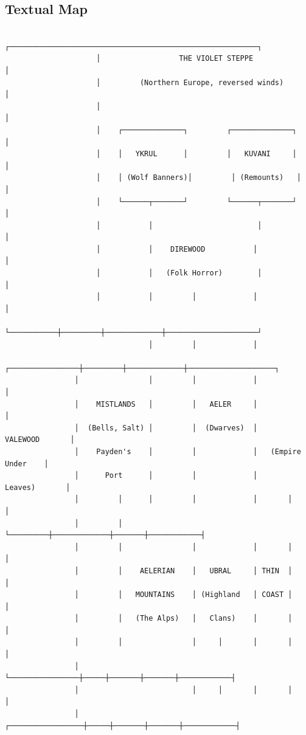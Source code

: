 \documentclass[11pt,letterpaper,twoside]{book}
\begin{document}
\subsection{Textual Map}

\begin{verbatim}
                     ┌─────────────────────────────────────────────────────────┐
                     │                  THE VIOLET STEPPE                     │
                     │         (Northern Europe, reversed winds)              │
                     │                                                         │
                     │    ┌──────────────┐         ┌──────────────┐           │
                     │    │   YKRUL      │         │   KUVANI     │           │
                     │    │ (Wolf Banners)│         │ (Remounts)   │           │
                     │    └──────┬───────┘         └──────┬───────┘           │
                     │           │                        │                     │
                     │           │    DIREWOOD           │                     │
                     │           │   (Folk Horror)        │                     │
                     │           │         │             │                     │
                     └───────────┼─────────┼─────────────┼─────────────────────┘
                                 │         │             │
                ┌────────────────┼─────────┼─────────────┼────────────────────┐
                │                │         │             │                    │
                │    MISTLANDS   │         │   AELER     │                    │
                │  (Bells, Salt) │         │  (Dwarves)  │     VALEWOOD       │
                │    Payden's    │         │             │   (Empire Under    │
                │      Port      │         │             │      Leaves)       │
                │         │      │         │             │       │            │
                │         │      └─────────┼─────────────┼───────┼────────────┤
                │         │                │             │       │            │
                │         │    AELERIAN    │   UBRAL     │ THIN  │            │
                │         │   MOUNTAINS    │ (Highland   │ COAST │            │
                │         │   (The Alps)   │   Clans)    │       │            │
                │         │                │     │       │       │            │
                │         └────────────────┼─────┼───────┼───────┼────────────┤
                │                          │     │       │       │            │
                │        ┌─────────────────┼─────┼───────┼───────┼────────────┤

\end{verbatim}
\end{document}
